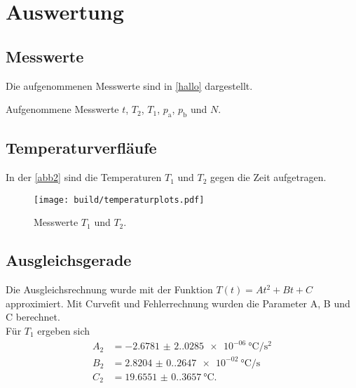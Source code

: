 \section{Auswertung}
\label{sec:Auswertung}

\subsection{Messwerte}
Die aufgenommenen Messwerte sind in \autoref{hallo} dargestellt.
\begin{table}
\centering
{}
\caption{Aufgenommene Messwerte $t$, $T_2$, $T_1$, $p_{\text{a}}$, $p_{\text{b}}$ und $N$.}
\label{hallo}
\end{table}
\newpage

\subsection{Temperaturverfläufe}
In der \autoref{abb2} sind die Temperaturen $T_1$ und $T_2$ gegen die Zeit aufgetragen.
\begin{figure}[H]
  \centering
  \texttt{[image: build/temperaturplots.pdf]}
  \caption{Messwerte $T_1$ und $T_2$.}
  \label{abb2}
\end{figure}

\subsection{Ausgleichsgerade}
Die Ausgleichsrechnung wurde mit der Funktion $T(t) = A t^2 + B t + C$ approximiert. Mit Curvefit und Fehlerrechnung 
wurden die Parameter A, B und C berechnet.\\
Für $T_1$ ergeben sich
\begin{align*}%
  A_2 &= \SI{-2.6781(2.0285)e-06}{\degreeCelsius\per\square\second}\\
  B_2 &= \SI{2.8204(0.2647)e-02}{\degreeCelsius\per\second}\\
  C_2 &= \SI{19.6551(0.3657)}{\degreeCelsius}.
\end{align*}

